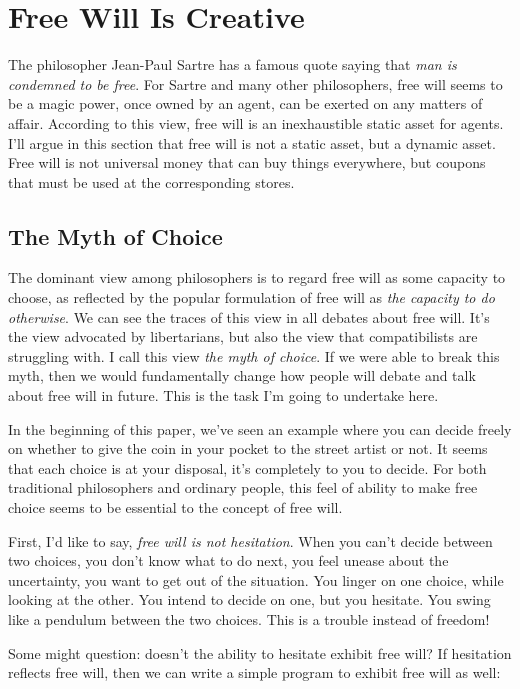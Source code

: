 \section{Free Will Is Creative}

The philosopher Jean-Paul Sartre has a famous quote saying that \emph{man is condemned to be free}. For Sartre and many other philosophers, free will seems to be a magic power, once owned by an agent, can be exerted on any matters of affair. According to this view, free will is an inexhaustible static asset for agents. I'll argue in this section that free will is not a static asset, but a dynamic asset. Free will is not universal money that can buy things everywhere, but coupons that must be used at the corresponding stores.

\subsection{The Myth of Choice}

The dominant view among philosophers is to regard free will as some capacity to choose, as reflected by the popular formulation of free will as \emph{the capacity to do otherwise}. We can see the traces of this view in all debates about free will. It's the view advocated by libertarians, but also the view that compatibilists are struggling with. I call this view \emph{the myth of choice}. If we were able to break this myth, then we would fundamentally change how people will debate and talk about free will in future. This is the task I'm going to undertake here.

In the beginning of this paper, we've seen an example where you can decide freely on whether to give the coin in your pocket to the street artist or not. It seems that each choice is at your disposal, it's completely to you to decide. For both traditional philosophers and ordinary people, this feel of ability to make free choice seems to be essential to the concept of free will.

First, I'd like to say, \emph{free will is not hesitation}. When you can't decide between two choices, you don't know what to do next, you feel unease about the uncertainty, you want to get out of the situation. You linger on one choice, while looking at the other. You intend to decide on one, but you hesitate. You swing like a pendulum between the two choices. This is a trouble instead of freedom!

Some might question: doesn't the ability to hesitate exhibit free will? If hesitation reflects free will, then we can write a simple program to exhibit free will as well:

